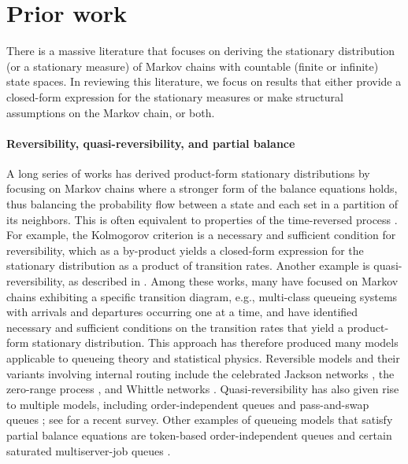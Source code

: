 \section{Prior work}
\label{sec:prior-work}

There is a massive literature that focuses on deriving
the stationary distribution (or a stationary measure)
of Markov chains with countable
(finite or infinite) state spaces.
In reviewing this literature, we focus on results that
either provide a closed-form expression for the stationary measures
or make structural assumptions on the Markov chain,
or both.

\paragraph*{Reversibility, quasi-reversibility, and partial balance}

A long series of works has derived product-form stationary distributions
by focusing on Markov chains
where a stronger form of the balance equations holds,
thus balancing the probability flow between a state and each set
in a partition of its neighbors.
This is often equivalent to
properties of the time-reversed process \cite{serfozo}.
For example, the Kolmogorov criterion \cite[Theorem~2.8]{serfozo}
is a necessary and sufficient condition for reversibility,
which as a by-product yields a closed-form expression for the stationary distribution
as a product of transition rates.
Another example is quasi-reversibility,
as described in \cite[Chapter~3]{kelly}.
Among these works, many have focused on Markov chains
exhibiting a specific transition diagram,
e.g., multi-class queueing systems with arrivals and departures occurring one at a time,
and have identified necessary and sufficient conditions
on the transition rates
that yield a product-form stationary distribution.
This approach has therefore produced many models
applicable to queueing theory and statistical physics.
Reversible models and their variants involving internal routing include
the celebrated Jackson networks \cite{J57},
the zero-range process \cite{A82},
and Whittle networks \cite{serfozo}.
Quasi-reversibility has also given rise to multiple models,
including order-independent queues \cite{BKK95,BK96}
and pass-and-swap queues \cite{CD21}; see \cite{GR20} for a recent survey.
Other examples of queueing models
that satisfy partial balance equations are
token-based order-independent queues \cite{ABDV22}
and certain saturated multiserver-job queues \cite{RM17,GHS23}.



